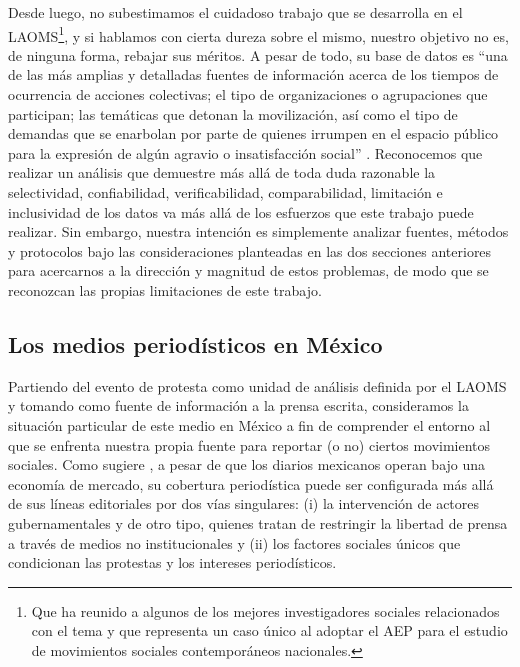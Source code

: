 \documentclass[letterpaper, 11pt]{book}
\theoremstyle{definition}
\theoremstyle{remark}
\begin{document}
Desde luego, no subestimamos el cuidadoso trabajo que se desarrolla en el LAOMS\footnote{
Que ha reunido a algunos de los mejores investigadores sociales relacionados con el tema y que representa un caso único al adoptar el AEP para el estudio de movimientos sociales contemporáneos nacionales.}, y si hablamos con cierta dureza sobre el mismo, nuestro objetivo no es, de ninguna forma, rebajar sus méritos.
A pesar de todo, su base de datos es ``una de las más amplias y detalladas fuentes de información acerca de los tiempos de ocurrencia de acciones colectivas; el tipo de organizaciones o agrupaciones que participan; las temáticas que detonan la movilización, así como el tipo de demandas que se enarbolan por parte de quienes irrumpen en el espacio público para la expresión de algún agravio o insatisfacción social'' \citep[1]{2017_Urbina_estudiantes}. 
Reconocemos que realizar un análisis que demuestre más allá de toda duda razonable la selectividad, confiabilidad, verificabilidad, comparabilidad, limitación e inclusividad de los datos va más allá de los esfuerzos que este trabajo puede realizar. 
Sin embargo, nuestra intención es simplemente analizar fuentes, métodos y protocolos bajo las consideraciones planteadas en las dos secciones anteriores para acercarnos a la dirección y magnitud de estos problemas, de modo que se reconozcan las propias limitaciones de este trabajo.





\subsection{Los medios periodísticos en México}
\label{sec:Mediosnacionales}

Partiendo del evento de protesta como unidad de análisis definida por el LAOMS y tomando como fuente de información a la prensa escrita, consideramos la situación particular de este medio en México a fin de comprender el entorno al que se enfrenta nuestra propia fuente para reportar (o no) ciertos movimientos sociales. 
Como sugiere \citet{2008_Strawn_mediaValidity}, a pesar de que los diarios mexicanos operan bajo una economía de mercado, su cobertura periodística puede ser configurada más allá de sus líneas editoriales por dos vías singulares: (i) la intervención de actores gubernamentales y de otro tipo, quienes tratan de restringir la libertad de prensa a través de medios no institucionales y (ii) los factores sociales únicos que condicionan las protestas y los intereses periodísticos.
\end{document}
